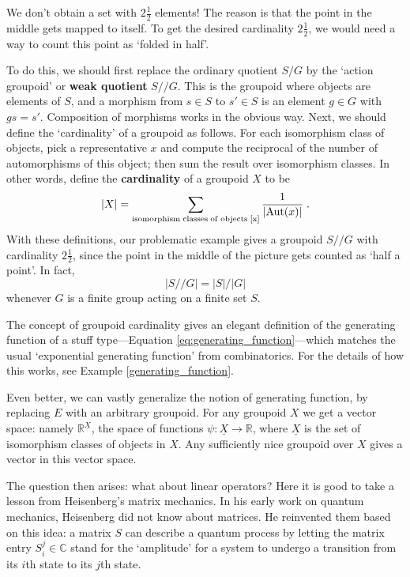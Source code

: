 \documentclass{article}
\renewcommand{\to}{\rightarrow}
\newcommand{\maps}{\colon}
\newcommand{\R}{{\mathbb R}}
\newcommand{\C}{{\mathbb C}}
\newcommand{\Aut}{{\rm Aut}}
\begin{document}
\noindent
We don't obtain a set with $2\frac{1}{2}$ elements!  The reason is
that the point in the middle gets mapped to itself.  To get the
desired cardinality $2 \frac{1}{2}$, we would need a way to count this
point as `folded in half'.

To do this, we should first replace the ordinary quotient $S/G$ by the
`action groupoid' or \textbf{weak quotient} $S/\!/G$.  This is the
groupoid where objects are elements of $S$, and a morphism from $s \in
S$ to $s' \in S$ is an element $g \in G$ with $gs = s'$.  Composition
of morphisms works in the obvious way.  Next, we should define the
`cardinality' of a groupoid as follows.  For each isomorphism class of
objects, pick a representative $x$ and compute the reciprocal of the
number of automorphisms of this object; then sum the result over
isomorphism classes.  In other words, define the \textbf{cardinality} of
a groupoid $X$ to be
\begin{equation}
\label{eq:groupoid_cardinality}
      |X| = \sum_{\rm isomorphism\; classes \; of \; objects\; [x]}
\frac{1}{|\Aut(x)|} \;. 
\end{equation}
With these definitions, our problematic example gives a groupoid
$S/\!/G$ with cardinality $2\frac{1}{2}$, since the point in the
middle of the picture gets counted as `half a point'.  In fact,
\[       |S/\!/G| = |S|/|G|    \]
whenever $G$ is a finite group acting on a finite set $S$.  

The concept of groupoid cardinality gives an elegant definition of the
generating function of a stuff type---Equation
\ref{eq:generating_function}---which matches the usual `exponential
generating function' from combinatorics.  For the details of how this
works, see Example \ref{generating_function}.

Even better, we can vastly generalize the notion of generating
function, by replacing $E$ with an arbitrary groupoid.  For any
groupoid $X$ we get a vector space: namely $\R^{\underline{X}}$, the
space of functions $\psi \maps \underline{X} \to \R$, where
$\underline{X}$ is the set of isomorphism classes of objects in $X$.
Any sufficiently nice groupoid over $X$ gives a vector in this
vector space.

The question then arises: what about linear operators?  Here it is 
good to take a lesson from Heisenberg's matrix mechanics.  In his
early work on quantum mechanics, Heisenberg did not know about matrices.
He reinvented them based on this idea: a matrix $S$ can describe
a quantum process by letting the matrix entry $S_i^j \in \C$ stand
for the `amplitude' for a system to undergo a transition from its 
$i$th state to its $j$th state.  
\end{document}
